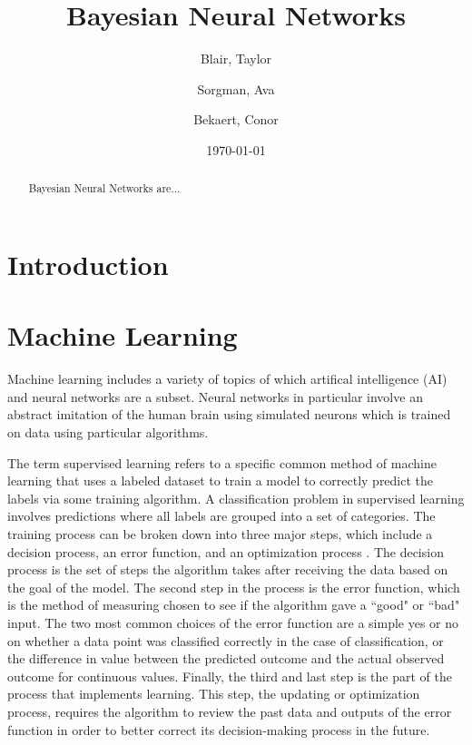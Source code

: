 \documentclass[12pt]{article}
\title{Bayesian Neural Networks}
\author{
	Blair, Taylor
	\and
	Sorgman, Ava
	\and
	Bekaert, Conor
}
\date{\today}
\begin{document}
\doublespacing
\maketitle



\begin{abstract}
	Bayesian Neural Networks are...
\end{abstract}

\tableofcontents

\section{Introduction}

	
\section{Machine Learning}
	
Machine learning includes a variety of topics of which artifical intelligence (AI) and neural networks are a subset. Neural networks in particular involve an abstract imitation of the human brain using simulated neurons which is trained on data using particular algorithms. 

The term supervised learning refers to a specific common method of machine learning that uses a labeled dataset to train a model to correctly predict the labels via some training algorithm. A classification problem in supervised learning involves predictions where all labels are grouped into a set of categories. The training process can be broken down into three major steps, which include a decision process, an error function, and an optimization process \cite{berkelyWhatIsML}. The decision process is the set of steps the algorithm takes after receiving the data based on the goal of the model. The second step in the process is the error function, which is the method of measuring chosen to see if the algorithm gave a ``good" or ``bad" input. The two most common choices of the error function are a simple yes or no on whether a data point was classified correctly in the case of classification, or the difference in value between the predicted outcome and the actual observed outcome for continuous values. Finally, the third and last step is the part of the process that implements learning. This step, the updating or optimization process, requires the algorithm to review the past data and outputs of the error function in order to better correct its decision-making process in the future.
\end{document}
